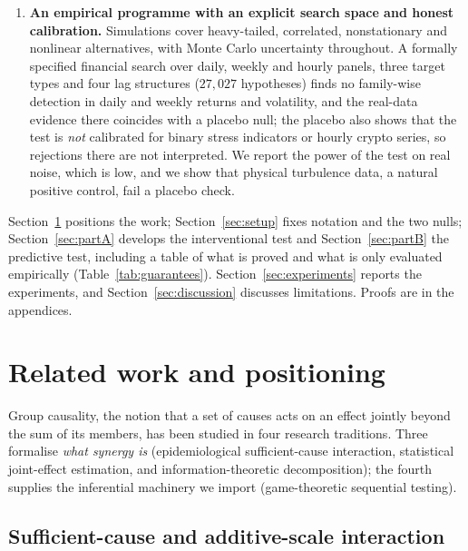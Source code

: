 \documentclass[pdflatex,sn-mathphys-ay]{sn-jnl}%
\theoremstyle{thmstyleone}%
\theoremstyle{thmstyletwo}%
\theoremstyle{thmstylethree}%
\begin{document}
\begin{enumerate}
\item \textbf{An empirical programme with an explicit search space and honest calibration.} Simulations cover
heavy-tailed, correlated, nonstationary and nonlinear alternatives, with Monte Carlo
uncertainty throughout. A formally specified financial search over daily, weekly and
hourly panels, three target types and four lag structures ($27{,}027$ hypotheses) finds no family-wise detection in daily and weekly returns and volatility, and the real-data evidence there coincides with a placebo null;
the placebo also shows that the test is \emph{not} calibrated for binary stress indicators or hourly crypto series, so rejections there are not interpreted. We report the power of the test on real noise,
which is low, and we show that physical turbulence data, a natural positive control, fail a placebo check.
\end{enumerate}

Section~\ref{sec:related} positions the work; Section~\ref{sec:setup} fixes notation and
the two nulls; Section~\ref{sec:partA} develops the interventional test and
Section~\ref{sec:partB} the predictive test, including a table of what is proved and
what is only evaluated empirically (Table~\ref{tab:guarantees}).
Section~\ref{sec:experiments} reports the experiments, and
Section~\ref{sec:discussion} discusses limitations. Proofs are in the appendices.

\section{Related work and positioning}\label{sec:related}

Group causality, the notion that a set of causes acts on an effect jointly beyond the sum
of its members, has been studied in four research traditions. Three formalise
\emph{what synergy is} (epidemiological sufficient-cause interaction, statistical
joint-effect estimation, and information-theoretic decomposition); the fourth supplies the
inferential machinery we import (game-theoretic sequential testing).

\subsection{Sufficient-cause and additive-scale interaction}\label{subsec:suff}
\end{document}
